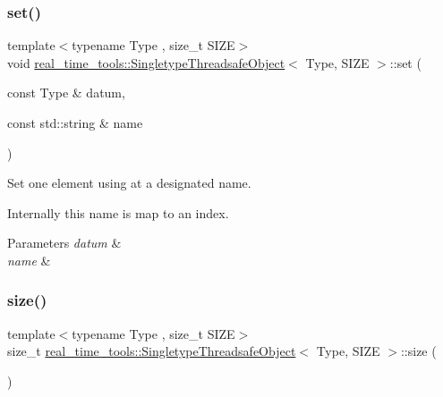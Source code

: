 \subsubsection{\texorpdfstring{set()}{set()}\hspace{0.1cm}{\footnotesize\ttfamily [3/3]}}
{\footnotesize\ttfamily template$<$typename Type , size\+\_\+t S\+I\+ZE$>$ \\
void \hyperlink{classreal__time__tools_1_1SingletypeThreadsafeObject}{real\+\_\+time\+\_\+tools\+::\+Singletype\+Threadsafe\+Object}$<$ Type, S\+I\+ZE $>$\+::set (\begin{DoxyParamCaption}\item[{const Type \&}]{datum,  }\item[{const std\+::string \&}]{name }\end{DoxyParamCaption})\hspace{0.3cm}{\ttfamily [inline]}}



Set one element using at a designated name. 

Internally this name is map to an index.


\begin{DoxyParams}{Parameters}
{\em datum} & \\
\hline
{\em name} & \\
\hline
\end{DoxyParams}
\mbox{\label{classreal__time__tools_1_1SingletypeThreadsafeObject_af09735c0e632800487bc50e4f2f7f512}} 
\subsubsection{\texorpdfstring{size()}{size()}}
{\footnotesize\ttfamily template$<$typename Type , size\+\_\+t S\+I\+ZE$>$ \\
size\+\_\+t \hyperlink{classreal__time__tools_1_1SingletypeThreadsafeObject}{real\+\_\+time\+\_\+tools\+::\+Singletype\+Threadsafe\+Object}$<$ Type, S\+I\+ZE $>$\+::size (\begin{DoxyParamCaption}{ }\end{DoxyParamCaption})\hspace{0.3cm}{\ttfamily [inline]}}



